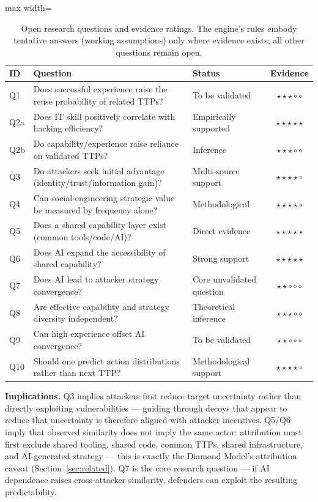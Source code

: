 \documentclass[preprints,article,accept,oneauthor]{Definitions/mdpi}
\begin{document}
\begin{table}[ht]
\centering
\begin{adjustbox}{max width=\linewidth}\begin{tabular}{@{}lllc@{}}
\toprule
\textbf{ID} & \textbf{Question} & \textbf{Status} & \textbf{Evidence} \\
\midrule
Q1  & Does successful experience raise the reuse probability of related TTPs? & To be validated & $\star\star\star\circ\circ$ \\
Q2a & Does IT skill positively correlate with hacking efficiency? & Empirically supported & $\star\star\star\star\star$ \\
Q2b & Do capability/experience raise reliance on validated TTPs? & Inference & $\star\star\star\circ\circ$ \\
Q3  & Do attackers seek initial advantage (identity/trust/information gain)? & Multi-source support & $\star\star\star\star\circ$ \\
Q4  & Can social-engineering strategic value be measured by frequency alone? & Methodological & $\star\star\star\star\circ$ \\
Q5  & Does a shared capability layer exist (common tools/code/AI)? & Direct evidence & $\star\star\star\star\star$ \\
Q6  & Does AI expand the accessibility of shared capability? & Strong support & $\star\star\star\star\star$ \\
Q7  & Does AI lead to attacker strategy convergence? & Core unvalidated question & $\star\star\circ\circ\circ$ \\
Q8  & Are effective capability and strategy diversity independent? & Theoretical inference & $\star\star\star\circ\circ$ \\
Q9  & Can high experience offset AI convergence? & To be validated & $\star\star\circ\circ\circ$ \\
Q10 & Should one predict action distributions rather than next TTP? & Methodological support & $\star\star\star\star\circ$ \\
\bottomrule
\end{tabular}\end{adjustbox}
\caption{Open research questions and evidence ratings. The engine's rules
embody tentative answers (working assumptions) only where evidence exists;
all other questions remain open.}
\label{tab:hypotheses}
\end{table}

\textbf{Implications.} Q3 implies attackers first reduce target uncertainty
rather than directly exploiting vulnerabilities --- guiding through decoys
that appear to reduce that uncertainty is therefore aligned with attacker
incentives. Q5/Q6 imply that observed similarity does not imply the same
actor: attribution must first exclude shared tooling, shared code, common
TTPs, shared infrastructure, and AI-generated strategy --- this is exactly
the Diamond Model's attribution caveat (Section~\ref{sec:related}). Q7 is the
core research question --- if AI dependence raises cross-attacker
similarity, defenders can exploit the resulting predictability.
\end{document}
